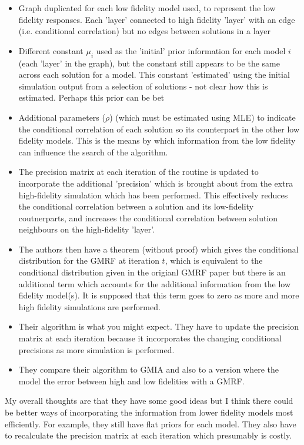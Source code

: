\message{ !name(SO-Methods.tex)}\documentclass{article}
\begin{document}
\begin{itemize}
\item Graph duplicated for each low fidelity model used, to represent the low fidelity responses. Each 'layer' connected to high fidelity 'layer' with an edge (i.e. conditional correlation) but no edges between solutions in a layer 
\item Different constant $\mu_i$ used as the 'initial' prior information for each model $i$ (each 'layer' in the graph), but the constant still appears to be the same across each solution for a model. This constant 'estimated' using the initial simulation output from a selection of solutions - not clear how this is estimated. Perhaps this prior can be bet
\item Additional parameters ($\rho$) (which must be estimated using MLE) to indicate the conditional correlation of each solution so its counterpart in the other low fidelity models. This is the means by which information from the low fidelity can influence the search of the algorithm.
\item The precision matrix at each iteration of the routine is updated to incorporate the additional 'precision' which is brought about from the extra high-fidelity simulation which has been performed. This effectively reduces the conditional correlation between a solution and its low-fidelity coutnerparts, and increases the conditional correlation between solution neighbours on the high-fidelity 'layer'.
\item The authors then have a theorem (without proof) which gives the conditional distribution for the GMRF at iteration $t$, which is equivalent to the conditional distribution given in the origianl GMRF paper but there is an additional term which accounts for the additional information from the low fidelity model(s). It is supposed that this term goes to zero as more and more high fidelity simulations are performed.
\item Their algorithm is what you might expect. They have to update the precision matrix at each iteration because it incorporates the changing conditional precisions as more simulation is performed.
\item They compare their algorithm to GMIA and also to a version where the model the error between high and low fidelities with a GMRF.
\end{itemize}

My overall thoughts are that they have some good ideas but I think there could be better ways of incorporating the information from lower fidelity models most efficiently. For example, they still have flat priors for each model. They also have to recalculate the precision matrix at each iteration which presumably is costly. 
\end{document}
